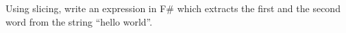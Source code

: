 Using slicing, write an expression in F\# which extracts the first and the second word from the string “hello world”.